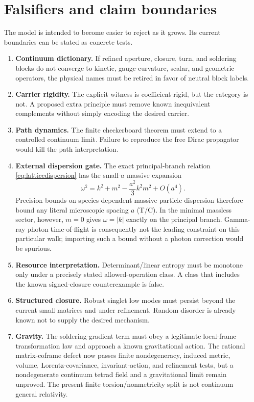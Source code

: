\documentclass[11pt]{article}
\newcommand{\Ttag}{\textcolor{external}{\textsc{T}}}
\newcommand{\Ctag}{\textcolor{conjectural}{\textsc{C}}}
\begin{document}
\section{Falsifiers and claim boundaries}
\label{sec:falsifiers}

The model is intended to become easier to reject as it grows.  Its current
boundaries can be stated as concrete tests.

\begin{enumerate}[leftmargin=1.7em]
  \item \textbf{Continuum dictionary.}  If refined aperture, closure, turn, and
  soldering blocks do not converge to kinetic, gauge-curvature, scalar, and
  geometric operators, the physical names must be retired in favor of neutral
  block labels.
  \item \textbf{Carrier rigidity.}  The explicit witness is coefficient-rigid,
  but the category is not.  A proposed extra principle must remove known
  inequivalent complements without simply encoding the desired carrier.
  \item \textbf{Path dynamics.}  The finite checkerboard theorem must extend to
  a controlled continuum limit.  Failure to reproduce the free Dirac
  propagator would kill the path interpretation.
  \item \textbf{External dispersion gate.}  The exact principal-branch relation
  \eqref{eq:latticedispersion} has the small-$a$ massive expansion
  \[
    \omega^2=k^2+m^2-\frac{a^2}{3}k^2m^2+O(a^4).
  \]
  Precision bounds on species-dependent massive-particle dispersion therefore
  bound any literal microscopic spacing $a$ (\Ttag/\Ctag).  In the minimal
  massless sector, however, $m=0$ gives $\omega=|k|$ exactly on the principal
  branch.  Gamma-ray photon time-of-flight is consequently not the leading
  constraint on this particular walk; importing such a bound without a photon
  correction would be spurious.
  \item \textbf{Resource interpretation.}  Determinant/linear entropy must be
  monotone only under a precisely stated allowed-operation class.  A class that
  includes the known signed-closure counterexample is false.
  \item \textbf{Structured closure.}  Robust singlet low modes must persist
  beyond the current small matrices and under refinement.  Random disorder is
  already known not to supply the desired mechanism.
  \item \textbf{Gravity.}  The soldering-gradient term must obey a legitimate
  local-frame transformation law and approach a known gravitational action.
  The rational matrix-coframe defect now passes finite nondegeneracy, induced
  metric, volume, Lorentz-covariance, invariant-action, and refinement tests,
  but a nondegenerate continuum tetrad field and a gravitational limit remain
  unproved.  The present finite
  torsion/nonmetricity split is not continuum general relativity.
\end{enumerate}
\end{document}

